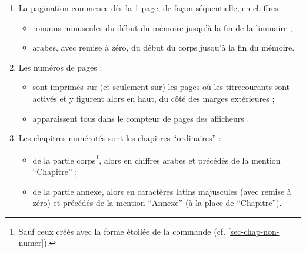 \begin{enumerate}
\begin{itemize}
  \item qui ouvrent les chapitres\footnote{%
      S'il s'agit d'un chapitre dont les pages sont numérotées, la page
      d'ouverture contient néanmoins sont numéro en pied de page.%
    } ;
  \item de 4\ieme{} de couverture (et son recto).
  \end{itemize}
\item
  La \gls{pagination} commence dès la 1\iere{} page, de façon séquentielle, en
  chiffres :
  \begin{itemize}
  \item romains minuscules du début du mémoire jusqu'à la fin de la
    \gls{liminaire} ;
  \item arabes, avec remise à zéro, du début du corps jusqu'à la fin du
    mémoire.
  \end{itemize}
\item Les numéros de pages :
  \begin{itemize}
  \item sont imprimés sur (et seulement sur) les pages où les
    \glspl{titrecourant} sont activés et y figurent alors en haut, du côté des
    marges extérieures ;
  \item apparaissent tous dans le compteur de pages des afficheurs
    \pdf{}.
  \end{itemize}
\item
  Les chapitres numérotés sont les chapitres \enquote{ordinaires} :
  \begin{itemize}
  \item de la partie corps\footnote{Sauf ceux créés avec la forme étoilée de la
      commande  (cf. \vref{sec-chap-non-numer}).}, alors
    en chiffres arabes et précédés de la mention \enquote{Chapitre} ;
  \item de la partie annexe, alors en caractères latins majuscules (avec remise
    à zéro) et précédés de la mention \enquote{Annexe} (à la place de \enquote{Chapitre}).
  \end{itemize}
\end{enumerate}

